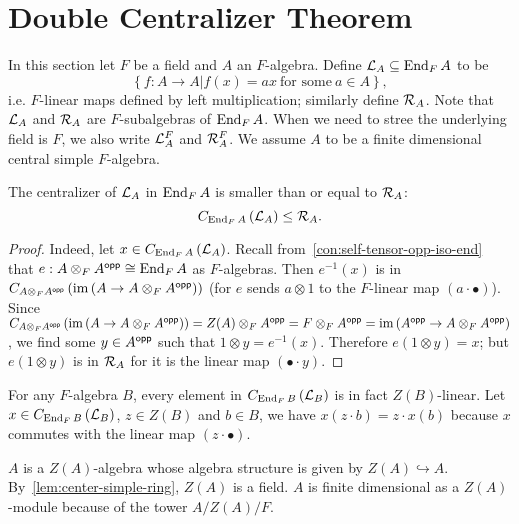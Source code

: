 \section{Double Centralizer Theorem}\label{sec:double-centralizer}

In this section let $F$ be a field and $A$ an $F$-algebra. Define
$\mathcal{L}_{A} \subseteq \operatorname{End}_{F}A$ to be
\[\left\{f : A \to A|f(x)=ax~\text{for some}~a\in A\right\},\]
i.e. $F$-linear maps defined by left multiplication; similarly define
$\mathcal{R}_{A}$. Note that $\mathcal{L}_{A}$ and $\mathcal{R}_A$ are $F$-subalgebras of
$\operatorname{End}_{F}A$. When we need to stree the underlying field is $F$, we also write
$\mathcal{L}_{A}^{F}$ and $\mathcal{R}_{A}^{F}$. We assume $A$ to be a finite dimensional
central simple $F$-algebra.
\begin{lemma}
  \label{lem:centralizer-mul-left-le}
  The centralizer of $\mathcal{L}_{A}$ in $\operatorname{End}_{F}A$ is smaller than or equal to
  $\mathcal{R}_{A}$:
  \[
    C_{\operatorname{End}_{F}A}\left(\mathcal{L}_{A}\right) \le \mathcal{R}_{A}.
  \]
  \leanok {}
\end{lemma}

\begin{proof}
  Indeed, let $x \in C_{\operatorname{End}_{F}A}\left(\mathcal{L}_{A}\right)$. Recall
  from~\cref{con:self-tensor-opp-iso-end} that
  $e : A\otimes_{F}A^{\mathsf{opp}}\cong \operatorname{End}_{F}A$ as $F$-algebras. Then $e^{-1}(x)$ is
  in
  $C_{A\otimes_{F}A^{\mathsf{opp}}}\left(\operatorname{im}\left(A\to A\otimes_{F}A^{\mathsf{opp}}\right)\right)$
  (for $e$ sends $a\otimes 1$ to the $F$-linear map $(a\cdot\bullet)$). Since
  $C_{A\otimes_{F}A^{\mathsf{opp}}}\left(\operatorname{im}\left(A\to A\otimes_{F}A^{\mathsf{opp}}\right)\right) = Z(A)\otimes_{F}A^{\mathsf{opp}}=F\otimes_{F}A^{\mathsf{opp}}=\operatorname{im}\left(A^{\mathsf{opp}}\to A\otimes_{F}A^{\mathsf{opp}}\right)$,
  we find some $y\in A^{\mathsf{opp}}$ such that $1 \otimes y = e^{-1}(x)$. Therefore
  $e\left(1\otimes y\right) = x$; but $e\left(1\otimes y\right)$ is in
  $\mathcal{R}_{A}$ for it is the linear map $(\bullet\cdot y)$.
\end{proof}

\begin{remark}\label{rem:mul-left-center-linear}
  For any $F$-algebra $B$, every element in $C_{\operatorname{End}_{F}B}\left(\mathcal{L}_{B}\right)$
  is in fact $Z(B)$-linear. Let $x\in C_{\operatorname{End}_{F}B}\left(\mathcal{L}_{B}\right)$,
  $z\in Z(B)$ and $b \in B$, we have $x(z\cdot b) = z\cdot x(b)$ because $x$
  commutes with the linear map $\left(z\cdot\bullet\right)$.
\end{remark}

\begin{remark}
  $A$ is a $Z(A)$-algebra whose algebra structure is given by
  $Z(A)\hookrightarrow A$. By~\cref{lem:center-simple-ring}, $Z(A)$ is a field.
  $A$ is finite dimensional as a $Z(A)$-module because of the tower $A/Z(A)/F$.
\end{remark}

